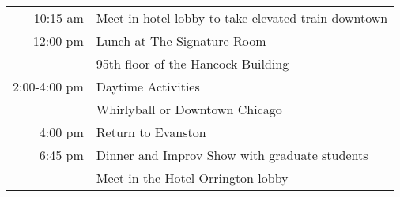 \documentclass[7pt]{article}
\begin{document}
\begin{tabular}[8cm]{ r   l }
\hline
10:15 am& Meet in hotel lobby to take elevated train downtown \rule{0cm}{0.4cm}\\ 

    12:00 pm&Lunch at The Signature Room \rule{0cm}{0.4cm}\\ 

    & 95th floor of the Hancock Building\rule{0cm}{0.4cm}\\ 

    2:00-4:00 pm& Daytime Activities\rule{0cm}{0.4cm}\\ 

    & Whirlyball or Downtown Chicago\\ 

    4:00 pm&Return to Evanston\rule{0cm}{0.4cm}\\ 

    6:45 pm&Dinner and Improv Show with graduate students \rule{0cm}{0.4cm}\\ 

    &\indent Meet in the Hotel Orrington lobby\\ 

\end{tabular}
\end{document}

